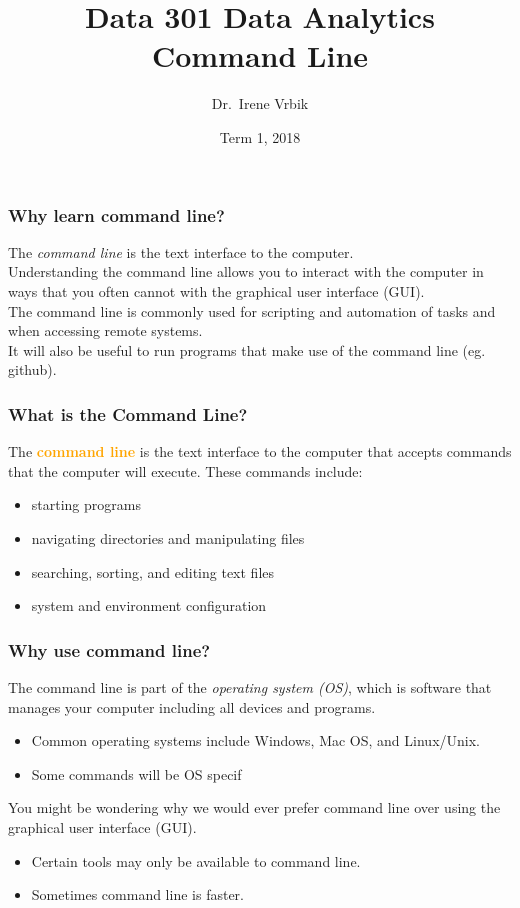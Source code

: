 \documentclass[xcolor=svgnames, colorlinks, handout]{beamer}
\title
  [Data 301 Data Analytics\hspace{2em}]
  {Data 301 Data Analytics\\
Command Line}
\author
  [Dr.\ Irene Vrbik]
  {Dr.\ Irene Vrbik}
\date
  {Term 1, 2018}
\institute
  {University of British Columbia Okanagan \newline irene.vrbik@ubc.ca}
\newcommand{\nl}{\\[1em]}
\newcommand{\define}[1]{\textbf{\textcolor{orange}{#1}}}
\newcommand{\ft}[1]{\frametitle{#1}}
\begin{document}
\maketitle


\begin{frame}\ft{Why learn command line?}
The \emph{command line} is the text interface to the computer.\nl

Understanding the command line allows you to interact with the computer in ways that you often cannot with the graphical user interface (GUI).\nl

The command line is commonly used for scripting and automation of tasks and when accessing remote systems.\nl

It will also be useful to run programs that make use of the command line (eg. github).

\end{frame}


\begin{frame}\ft{What is the Command Line?}
The \define{command line} is the text interface to the computer that accepts commands that the computer will execute.  These commands include:
\begin{itemize}
\item starting programs
\item navigating directories and manipulating files
\item searching, sorting, and editing text files
\item system and environment configuration
\end{itemize}
\end{frame}




\begin{frame}\ft{Why use command line?}
The command line is part of the \emph{operating system (OS)}, which is software that manages your computer including all devices and programs.
\begin{itemize}
\item Common operating systems include Windows, Mac OS, and Linux/Unix.
\item \alert{Some commands will be OS specif}\bigskip
\end{itemize}


You might be wondering why we would ever prefer command line over using the graphical user interface (GUI).
\begin{itemize}
\item Certain tools may only be available to command line.
\item Sometimes command line is faster.\bigskip %
\end{itemize}

\end{frame}
\end{document}
